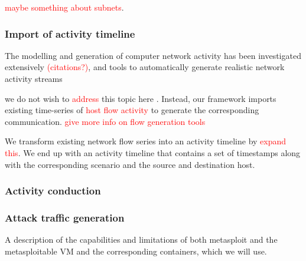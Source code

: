 \documentclass[sigconf]{acmart}
\begin{document}
\textcolor{red}{maybe something about subnets}. 

\subsubsection*{Import of activity timeline}

The modelling and generation of computer network activity has been investigated extensively \textcolor{red}{(citations?)}, and tools to automatically generate realistic network activity streams 

we do not wish to \textcolor{red}{address} this topic here . Instead, our framework imports existing time-series of \textcolor{red}{host flow activity} to generate the corresponding communication. \textcolor{red}{give more info on flow generation tools} 

We transform existing network flow series into an activity timeline by \textcolor{red}{expand this}. We end up with an activity timeline that contains a set of timestamps along with the corresponding scenario and the source and destination host. 

\subsubsection*{Activity conduction}


\subsubsection*{Attack traffic generation}

A description of the capabilities and limitations of both metasploit and the metasploitable VM and the corresponding containers, which we will use.




\end{document}
